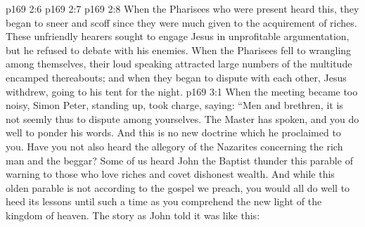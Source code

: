 \vs p169 2:6 
\vs p169 2:7 
\vs p169 2:8 \pc When the Pharisees who were present heard this, they began to sneer and scoff since they were much given to the acquirement of riches. These unfriendly hearers sought to engage Jesus in unprofitable argumentation, but he refused to debate with his enemies. When the Pharisees fell to wrangling among themselves, their loud speaking attracted large numbers of the multitude encamped thereabouts; and when they began to dispute with each other, Jesus withdrew, going to his tent for the night.
\vs p169 3:1 When the meeting became too noisy, Simon Peter, standing up, took charge, saying: “Men and brethren, it is not seemly thus to dispute among yourselves. The Master has spoken, and you do well to ponder his words. And this is no new doctrine which he proclaimed to you. Have you not also heard the allegory of the Nazarites concerning the rich man and the beggar? Some of us heard John the Baptist thunder this parable of warning to those who love riches and covet dishonest wealth. And while this olden parable is not according to the gospel we preach, you would all do well to heed its lessons until such a time as you comprehend the new light of the kingdom of heaven. The story as John told it was like this:
